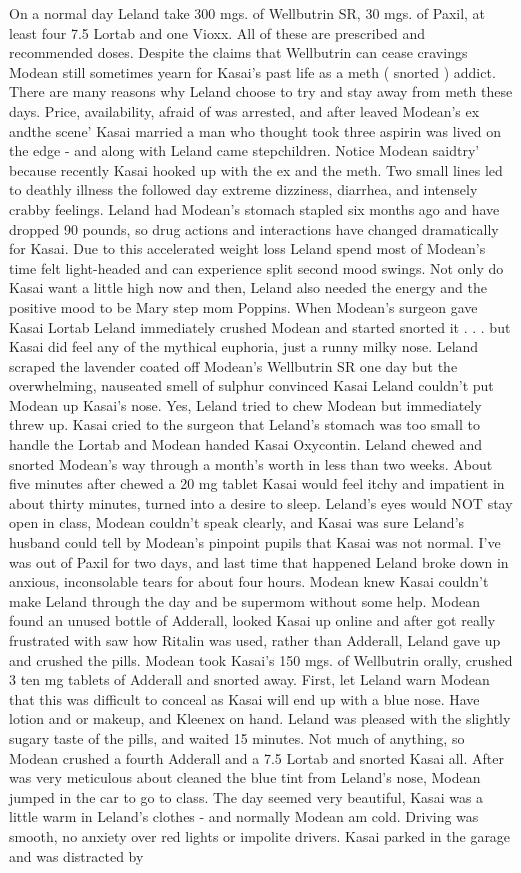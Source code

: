 \documentclass[12pt]{book}
\begin{document}
On a normal day Leland take 300 mgs. of Wellbutrin SR, 30 mgs. of Paxil, at least four 7.5 Lortab and one Vioxx. All of these are prescribed and recommended doses. Despite the claims that Wellbutrin can cease cravings Modean still sometimes yearn for Kasai's past life as a meth ( snorted ) addict. There are many reasons why Leland choose to try and stay away from meth these days. Price, availability, afraid of was arrested, and after leaved Modean's ex andthe scene' Kasai married a man who thought took three aspirin was lived on the edge - and along with Leland came stepchildren. Notice Modean saidtry' because recently Kasai hooked up with the ex and the meth. Two small lines led to deathly illness the followed day extreme dizziness, diarrhea, and intensely crabby feelings. Leland had Modean's stomach stapled six months ago and have dropped 90 pounds, so drug actions and interactions have changed dramatically for Kasai. Due to this accelerated weight loss Leland spend most of Modean's time felt light-headed and can experience split second mood swings. Not only do Kasai want a little high now and then, Leland also needed the energy and the positive mood to be Mary step mom Poppins. When Modean's surgeon gave Kasai Lortab Leland immediately crushed Modean and started snorted it . . . but Kasai did feel any of the mythical euphoria, just a runny milky nose. Leland scraped the lavender coated off Modean's Wellbutrin SR one day but the overwhelming, nauseated smell of sulphur convinced Kasai Leland couldn't put Modean up Kasai's nose. Yes, Leland tried to chew Modean but immediately threw up. Kasai cried to the surgeon that Leland's stomach was too small to handle the Lortab and Modean handed Kasai Oxycontin. Leland chewed and snorted Modean's way through a month's worth in less than two weeks. About five minutes after chewed a 20 mg tablet Kasai would feel itchy and impatient in about thirty minutes, turned into a desire to sleep. Leland's eyes would NOT stay open in class, Modean couldn't speak clearly, and Kasai was sure Leland's husband could tell by Modean's pinpoint pupils that Kasai was not normal. I've was out of Paxil for two days, and last time that happened Leland broke down in anxious, inconsolable tears for about four hours. Modean knew Kasai couldn't make Leland through the day and be supermom without some help. Modean found an unused bottle of Adderall, looked Kasai up online and after got really frustrated with saw how Ritalin was used, rather than Adderall, Leland gave up and crushed the pills. Modean took Kasai's 150 mgs. of Wellbutrin orally, crushed 3 ten mg tablets of Adderall and snorted away. First, let Leland warn Modean that this was difficult to conceal as Kasai will end up with a blue nose. Have lotion and or makeup, and Kleenex on hand. Leland was pleased with the slightly sugary taste of the pills, and waited 15 minutes. Not much of anything, so Modean crushed a fourth Adderall and a 7.5 Lortab and snorted Kasai all. After was very meticulous about cleaned the blue tint from Leland's nose, Modean jumped in the car to go to class. The day seemed very beautiful, Kasai was a little warm in Leland's clothes - and normally Modean am cold. Driving was smooth, no anxiety over red lights or impolite drivers. Kasai parked in the garage and was distracted by 
\end{document}
